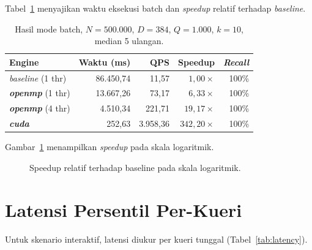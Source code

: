 \documentclass[12pt,a4paper,oneside]{report}
\newcommand{\keyword}[1]{\textbf{\textit{#1}}}
\begin{document}
Tabel~\ref{tab:batch} menyajikan waktu eksekusi batch dan \textit{speedup} relatif terhadap \textit{baseline}.

\begin{table}[H]
\centering
\caption{Hasil mode batch, $N=500.000$, $D=384$, $Q=1.000$, $k=10$, median 5 ulangan.}
\label{tab:batch}
\begin{tabular}{@{}l r r r r@{}}
\toprule
\textbf{Engine} & \textbf{Waktu (ms)} & \textbf{QPS} & \textbf{Speedup} & \textit{Recall}\\
\midrule
\textit{baseline} (1 thr) & 86.450,74 & 11,57 & $1{,}00\times$ & 100\%\\
\keyword{openmp} (1 thr)   & 13.667,26 & 73,17 & $6{,}33\times$ & 100\%\\
\keyword{openmp} (4 thr)   & 4.510,34  & 221,71 & $19{,}17\times$ & 100\%\\
\keyword{cuda}             & 252,63    & 3.958,36 & $342{,}20\times$ & 100\%\\
\bottomrule
\end{tabular}
\end{table}

Gambar~\ref{fig:speedup} menampilkan \textit{speedup} pada skala logaritmik.

\begin{figure}[H]
\centering
{}
\caption{Speedup relatif terhadap baseline pada skala logaritmik.}
\label{fig:speedup}
\end{figure}

\section{Latensi Persentil Per-Kueri}

Untuk skenario interaktif, latensi diukur per kueri tunggal (Tabel~\ref{tab:latency}).
\end{document}
